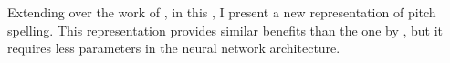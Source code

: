 

Extending over the work of \textcite{micchi2020not}, in this \thesisdiss, I present a new representation of pitch spelling. This representation provides similar benefits than the one by \textcite{micchi2020not}, but it requires less parameters in the neural network architecture.
